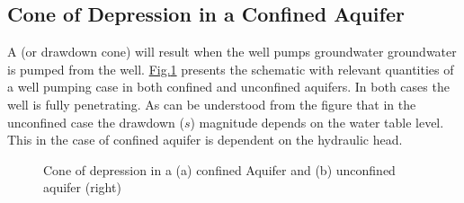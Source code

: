 \documentclass[letterpaper,10pt,english]{jupyterBook}
\begin{document}
\subsection{Cone of Depression in a Confined Aquifer}
\label{\detokenize{content/flow/L8/18_wells:cone-of-depression-in-a-confined-aquifer}}
\sphinxAtStartPar
A  (or drawdown cone) will result when the well pumps groundwater groundwater is pumped from the well. \hyperref[\detokenize{content/flow/L8/18_wells:cone-con-un}]{Fig.\@ \ref{\detokenize{content/flow/L8/18_wells:cone-con-un}}} presents the schematic with relevant quantities of a well pumping case in both confined and unconfined aquifers. In both cases the well is fully penetrating. As can be understood from the figure that in the unconfined case the drawdown (\(s\)) magnitude depends on the water table level. This in the case of confined aquifer is dependent on the hydraulic head.

\begin{figure}[htbp]
\centering
\capstart

\noindent{}
\caption{Cone of depression in a (a) confined Aquifer and (b) unconfined aquifer (right)}\label{\detokenize{content/flow/L8/18_wells:cone-con-un}}\end{figure}
\end{document}
